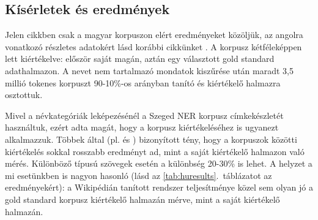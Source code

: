 \documentclass{llncs}
\begin{document}
\subsection{Kísérletek és eredmények}

Jelen cikkben csak a magyar korpuszon elért eredményeket közöljük, az angolra vonatkozó részletes adatokért lásd korábbi cikkünket \cite{simon-nemeskey:2012:NEWS2012}. 
A korpusz kétféleképpen lett kiértékelve: először saját magán, aztán egy választott gold standard adathalmazon. A nevet nem tartalmazó mondatok kiszűrése után maradt 3,5 millió tokenes korpuszt 90-10\%-os arányban tanító és kiértékelő halmazra osztottuk. 

Mivel a névkategóriák leképezésénél a Szeged NER korpusz címkekészletét használtuk, ezért adta magát, hogy a korpusz kiértékeléséhez is ugyanezt alkalmazzuk. Többek által (pl. \cite{Nothman:08} és \cite{ciaramita2005}) bizonyított tény, hogy a korpuszok közötti kiértékelés sokkal rosszabb eredményt ad, mint a saját kiértékelő halmazon való mérés. Különböző típusú szövegek esetén a különbség 20-30\% is lehet. A helyzet a mi esetünkben is nagyon hasonló (lásd az \ref{tab:huresults}.~táblázatot az eredményekért): a Wikipédián tanított rendszer teljesítménye közel sem olyan jó a gold standard korpusz kiértékelő halmazán mérve, mint a saját kiértékelő halmazán. 

\end{document}
